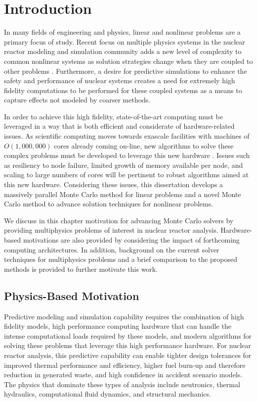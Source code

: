 \chapter{Introduction}
\label{ch:introduction}
In many fields of engineering and physics, linear and nonlinear
problems are a primary focus of study. Recent focus on multiple
physics systems in the nuclear reactor modeling and simulation
community adds a new level of complexity to common nonlinear systems
as solution strategies change when they are coupled to other problems
\citep{u.s._department_of_energy_casl_2011}. Furthermore, a desire
for predictive simulations to enhance the safety and performance of
nuclear systems creates a need for extremely high fidelity
computations to be performed for these coupled systems as a means to
capture effects not modeled by coarser methods.

In order to achieve this high fidelity, state-of-the-art computing
 must be leveraged in a way that is both efficient
and considerate of hardware-related issues. As scientific computing
moves towards exascale facilities with machines of $O(1,000,000)$
cores already coming on-line, new algorithms to solve these complex
problems must be developed to leverage this new hardware
\citep{kogge_using_2011}. Issues such as resiliency to node failure,
limited growth of memory available per node, and scaling to large
numbers of cores will be pertinent to robust algorithms aimed at this
new hardware. Considering these issues, this dissertation develops a
massively parallel Monte Carlo method for linear problems and a novel
Monte Carlo method to advance solution techniques for nonlinear
problems.

We discuss in this chapter motivation for advancing Monte Carlo
solvers by providing multiphysics problems of interest in nuclear
reactor analysis. Hardware-based motivations are also provided by
considering the impact of forthcoming computing architectures. In
addition, background on the current solver techniques for multiphysics
problems and a brief comparison to the proposed methods is provided
to further motivate this work.

\section{Physics-Based Motivation}
\label{sec:physics_motivation}
Predictive modeling and simulation capability requires the combination
of high fidelity models, high performance computing hardware that can
handle the intense computational loads required by these models, and
modern algorithms for solving these problems that leverage this high
performance hardware. For nuclear reactor analysis, this predictive
capability can enable tighter design tolerances for improved thermal
performance and efficiency, higher fuel burn-up and therefore reduction
in generated waste, and high confidence in accident scenario
models. The physics that dominate these types of analysis include
neutronics, thermal hydraulics, computational fluid dynamics, and
structural mechanics.

